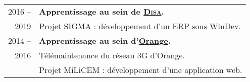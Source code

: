 \begin{supertabular}{rl}
    \textsc{2016 --} & \textbf{Apprentissage au sein de \href{http://www.disa.fr}{\textsc{Disa}}.}\\
    \textsc{2019} & Projet SIGMA : d\'eveloppement d'un ERP sous WinDev.\\[1.5ex]
    \textsc{2014 --} & \textbf{Apprentissage au sein d'\href{https://www.orange.com/en/accueil}{Orange}.}\\
    \textsc{2016} & T\'el\'emaintenance du r\'eseau 3G d'Orange.\\
    & Projet MiLiCEM : d\'eveloppement d'une application web.\\
\end{supertabular}

\medskip
